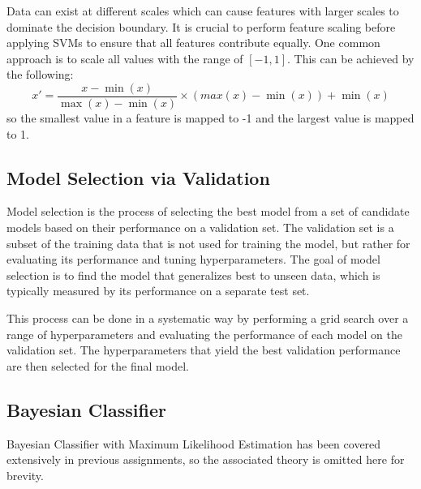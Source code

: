 \documentclass[12pt, letterpaper]{article}
\begin{document}
Data can exist at different scales which can cause features with larger scales to
dominate the decision boundary. It is crucial to perform feature scaling before applying SVMs to
ensure that all features contribute equally. One common approach is to scale all values with
the range of $[-1, 1]$. This can be achieved by the following:
\begin{equation*}
	x' = \frac{x - \min(x)}{\max(x) - \min(x)} \times (max(x) - \min(x)) + \min(x)
\end{equation*}
so the smallest value in a feature is mapped to -1 and the largest value is mapped to 1.


\subsection{Model Selection via Validation}
Model selection is the process of selecting the best model from a set of candidate models based
on their performance on a validation set. The validation set is a subset of the training data
that is not used for training the model, but rather for evaluating its performance and tuning
hyperparameters. The goal of model selection is to find the model that generalizes best to
unseen data, which is typically measured by its performance on a separate test set.

This process can be done in a systematic way by performing a grid search over a range of
hyperparameters and evaluating the performance of each model on the validation set.
The hyperparameters that yield the best validation performance are then selected for the
final model.

\subsection{Bayesian Classifier}
Bayesian Classifier with Maximum Likelihood Estimation has been covered extensively in
previous assignments, so the associated theory is omitted here for brevity.

\end{document}
